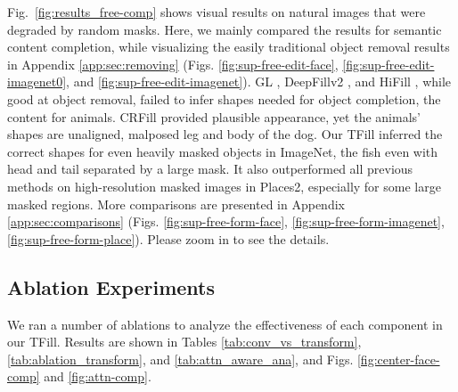 \documentclass[10pt,twocolumn,letterpaper]{article}
\begin{document}
Fig.\ \ref{fig:results_free-comp} shows visual results on natural images that were degraded by random masks. Here, we mainly compared the results for semantic content completion, while visualizing the easily traditional object removal results in Appendix \ref{app:sec:removing} (Figs. \ref{fig:sup-free-edit-face}, \ref{fig:sup-free-edit-imagenet0}, and \ref{fig:sup-free-edit-imagenet}). GL \cite{iizuka2017globally}, DeepFillv2 \cite{yu2019free}, and HiFill \cite{yi2020contextual}, while good at object removal, failed to infer shapes needed for object completion, \eg the content for animals. CRFill \cite{zeng2021generative} provided plausible appearance, yet the animals' shapes are unaligned, \eg malposed leg and body of the dog. Our TFill inferred the correct shapes for even heavily masked objects in ImageNet, \eg the fish even with head and tail separated by a large mask. It also outperformed all previous methods on high-resolution masked images in Places2, especially for some large masked regions. More comparisons are presented in Appendix \ref{app:sec:comparisons} (Figs. \ref{fig:sup-free-form-face}, \ref{fig:sup-free-form-imagenet}, \ref{fig:sup-free-form-place}). Please zoom in to see the details.

\subsection{Ablation Experiments}

We ran a number of ablations to analyze the effectiveness of each component in our TFill. Results are shown in Tables \ref{tab:conv_vs_transform}, \ref{tab:ablation_transform}, and \ref{tab:attn_aware_ana}, and Figs. \ref{fig:center-face-comp} and \ref{fig:attn-comp}.
\end{document}
